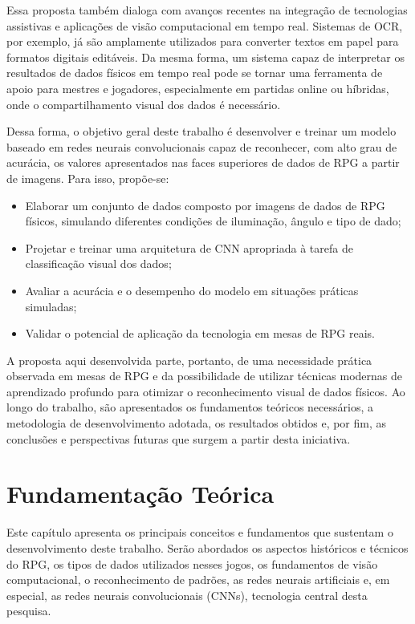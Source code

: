 Essa proposta também dialoga com avanços recentes na integração de tecnologias assistivas e aplicações de
visão computacional em tempo real. Sistemas de OCR, por exemplo, já são amplamente utilizados para converter
textos em papel para formatos digitais editáveis. Da mesma forma, um sistema capaz de interpretar os
resultados de dados físicos em tempo real pode se tornar uma ferramenta de apoio para mestres e jogadores,
especialmente em partidas online ou híbridas, onde o compartilhamento visual dos dados é necessário.

Dessa forma, o objetivo geral deste trabalho é desenvolver e treinar um modelo baseado em redes neurais
convolucionais capaz de reconhecer, com alto grau de acurácia, os valores apresentados nas faces superiores
de dados de RPG a partir de imagens. Para isso, propõe-se:

\begin{itemize}
    \item Elaborar um conjunto de dados composto por imagens de dados de RPG físicos,
          simulando diferentes condições de iluminação, ângulo e tipo de dado;
    \item Projetar e treinar uma arquitetura de CNN apropriada à tarefa de
          classificação visual dos dados;
    \item Avaliar a acurácia e o desempenho do modelo em situações práticas simuladas;
    \item Validar o potencial de aplicação da tecnologia em mesas de RPG reais.
\end{itemize}

A proposta aqui desenvolvida parte, portanto, de uma necessidade prática observada em mesas de RPG e da
possibilidade de utilizar técnicas modernas de aprendizado profundo para otimizar o reconhecimento visual de
dados físicos. Ao longo do trabalho, são apresentados os fundamentos teóricos necessários, a metodologia de
desenvolvimento adotada, os resultados obtidos e, por fim, as conclusões e perspectivas futuras que surgem a
partir desta iniciativa.


\section{Fundamentação Teórica}

Este capítulo apresenta os principais conceitos e fundamentos
que sustentam o desenvolvimento deste trabalho. Serão abordados
os aspectos históricos e técnicos do RPG, os tipos de dados
utilizados nesses jogos, os fundamentos de visão computacional,
o reconhecimento de padrões, as redes neurais artificiais e,
em especial, as redes neurais convolucionais (CNNs), tecnologia
central desta pesquisa.

